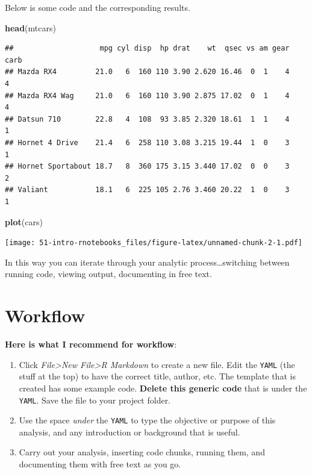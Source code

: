 \documentclass[
]{book}
\newenvironment{Shaded}{\begin{snugshade}}{\end{snugshade}}
\newcommand{\FunctionTok}[1]{\textcolor[rgb]{0.13,0.29,0.53}{\textbf{#1}}}
\newcommand{\NormalTok}[1]{#1}
\providecommand{\tightlist}{%
  \setlength{\itemsep}{0pt}\setlength{\parskip}{0pt}}
\begin{document}
Below is some code and the corresponding results.

\begin{Shaded}
\begin{Highlighting}[]
\FunctionTok{head}\NormalTok{(mtcars)}
\end{Highlighting}
\end{Shaded}

\begin{verbatim}
##                    mpg cyl disp  hp drat    wt  qsec vs am gear carb
## Mazda RX4         21.0   6  160 110 3.90 2.620 16.46  0  1    4    4
## Mazda RX4 Wag     21.0   6  160 110 3.90 2.875 17.02  0  1    4    4
## Datsun 710        22.8   4  108  93 3.85 2.320 18.61  1  1    4    1
## Hornet 4 Drive    21.4   6  258 110 3.08 3.215 19.44  1  0    3    1
## Hornet Sportabout 18.7   8  360 175 3.15 3.440 17.02  0  0    3    2
## Valiant           18.1   6  225 105 2.76 3.460 20.22  1  0    3    1
\end{verbatim}

\begin{Shaded}
\begin{Highlighting}[]
\FunctionTok{plot}\NormalTok{(cars)}
\end{Highlighting}
\end{Shaded}

\texttt{[image: 51-intro-rnotebooks\_files/figure-latex/unnamed-chunk-2-1.pdf]}

In this way you can iterate through your analytic process\ldots switching between running code, viewing output, documenting in free text.

\hypertarget{workflow}{%
\section{Workflow}\label{workflow}}

\textbf{Here is what I recommend for workflow}:

\begin{enumerate}
\def\labelenumi{\arabic{enumi}.}
\tightlist
\item
  Click \emph{File\textgreater New File\textgreater R Markdown} to create a new file. Edit the \texttt{YAML} (the stuff at the top) to have the correct title, author, etc. The template that is created has some example code. \textbf{Delete this generic code} that is under the \texttt{YAML}. Save the file to your project folder.
\item
  Use the space \emph{under} the \texttt{YAML} to type the objective or purpose of this analysis, and any introduction or background that is useful.
\item
  Carry out your analysis, inserting code chunks, running them, and documenting them with free text as you go.
\end{enumerate}
\end{document}
